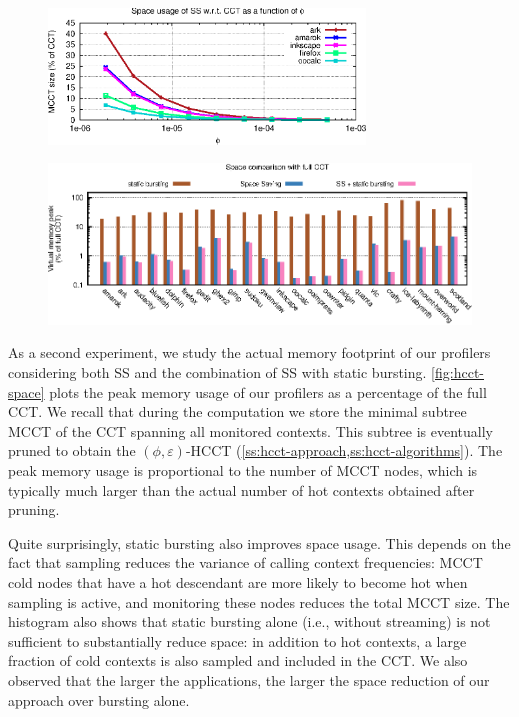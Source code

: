 \ifdefined\noauthorea
\begin{figure}[!ht]
\begin{center}
\includegraphics[width=0.75\textwidth]{figures/hcct-space-by-phi/hcct-space-by-phi.eps}
\caption{\protect}
\end{center}
\end{figure}
\fi

\ifdefined\noauthorea
\begin{figure}[!ht]
\begin{center}
\includegraphics[width=\textwidth]{figures/hcct-space/hcct-space.eps}
\caption{\protect}
\end{center}
\end{figure}
\fi

As a second experiment, we study the actual memory footprint of our profilers considering both SS and the combination of SS with static bursting. \myfigure\ref{fig:hcct-space} plots the peak memory usage of our profilers as a percentage of the full CCT. We recall that during the computation we store the minimal subtree MCCT of the CCT spanning all monitored contexts. This subtree is eventually pruned to obtain the $(\phi,\varepsilon)$-HCCT (\mysection\ref{ss:hcct-approach,ss:hcct-algorithms}). The peak memory usage is proportional to the number of MCCT nodes, which is typically much larger than the actual number of hot contexts obtained after pruning.

\noindent Quite surprisingly, static bursting also improves space usage. This depends on the fact that sampling reduces the variance of calling context frequencies: MCCT cold nodes that have a hot descendant are more likely to become hot when sampling is active, and monitoring these nodes reduces the total MCCT size. The histogram also shows that static bursting alone (i.e., without streaming) is not sufficient to substantially reduce space: in addition to hot contexts, a large fraction of cold contexts is also sampled and included in the CCT. We also observed that the larger the applications, the larger the space reduction of our approach over bursting alone.

